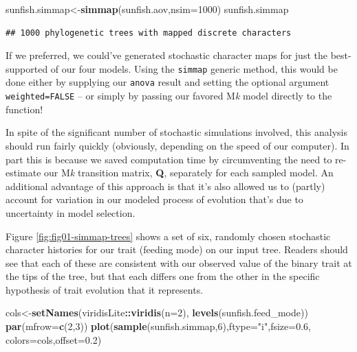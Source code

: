 \documentclass[fleqn,10pt,lineno]{wlpeerj} %
\newenvironment{Shaded}{\begin{snugshade}}{\end{snugshade}}
\newcommand{\AttributeTok}[1]{\textcolor[rgb]{0.13,0.29,0.53}{#1}}
\newcommand{\DecValTok}[1]{\textcolor[rgb]{0.00,0.00,0.81}{#1}}
\newcommand{\FloatTok}[1]{\textcolor[rgb]{0.00,0.00,0.81}{#1}}
\newcommand{\FunctionTok}[1]{\textcolor[rgb]{0.13,0.29,0.53}{\textbf{#1}}}
\newcommand{\NormalTok}[1]{#1}
\newcommand{\OtherTok}[1]{\textcolor[rgb]{0.56,0.35,0.01}{#1}}
\newcommand{\SpecialCharTok}[1]{\textcolor[rgb]{0.81,0.36,0.00}{\textbf{#1}}}
\newcommand{\StringTok}[1]{\textcolor[rgb]{0.31,0.60,0.02}{#1}}
\begin{document}
\begin{Shaded}
\begin{Highlighting}[]
\NormalTok{sunfish.simmap}\OtherTok{\textless{}{-}}\FunctionTok{simmap}\NormalTok{(sunfish.aov,}\AttributeTok{nsim=}\DecValTok{1000}\NormalTok{)}
\NormalTok{sunfish.simmap}
\end{Highlighting}
\end{Shaded}

\begin{verbatim}
## 1000 phylogenetic trees with mapped discrete characters
\end{verbatim}

If we preferred, we could've generated stochastic character maps for just the best-supported of our four models. Using the \texttt{simmap} generic method, this would be done either by supplying our \texttt{anova} result and setting the optional argument \texttt{weighted=FALSE} -- or simply by passing our favored M\emph{k} model directly to the function!

In spite of the significant number of stochastic simulations involved, this analysis should run fairly quickly (obviously, depending on the speed of our computer). In part this is because we saved computation time by circumventing the need to re-estimate our M\emph{k} transition matrix, \textbf{Q}, separately for each sampled model. An additional advantage of this approach is that it's also allowed us to (partly) account for variation in our modeled process of evolution that's due to uncertainty in model selection.

Figure \ref{fig:fig01-simmap-trees} shows a set of six, randomly chosen stochastic character histories for our trait (feeding mode) on our input tree. Readers should see that each of these are consistent with our observed value of the binary trait at the tips of the tree, but that each differs one from the other in the specific hypothesis of trait evolution that it represents.

\begin{Shaded}
\begin{Highlighting}[]
\NormalTok{cols}\OtherTok{\textless{}{-}}\FunctionTok{setNames}\NormalTok{(viridisLite}\SpecialCharTok{::}\FunctionTok{viridis}\NormalTok{(}\AttributeTok{n=}\DecValTok{2}\NormalTok{),}
  \FunctionTok{levels}\NormalTok{(sunfish.feed\_mode))}
\FunctionTok{par}\NormalTok{(}\AttributeTok{mfrow=}\FunctionTok{c}\NormalTok{(}\DecValTok{2}\NormalTok{,}\DecValTok{3}\NormalTok{))}
\FunctionTok{plot}\NormalTok{(}\FunctionTok{sample}\NormalTok{(sunfish.simmap,}\DecValTok{6}\NormalTok{),}\AttributeTok{ftype=}\StringTok{"i"}\NormalTok{,}\AttributeTok{fsize=}\FloatTok{0.6}\NormalTok{,}
  \AttributeTok{colors=}\NormalTok{cols,}\AttributeTok{offset=}\FloatTok{0.2}\NormalTok{)}
\end{Highlighting}
\end{Shaded}
\end{document}
